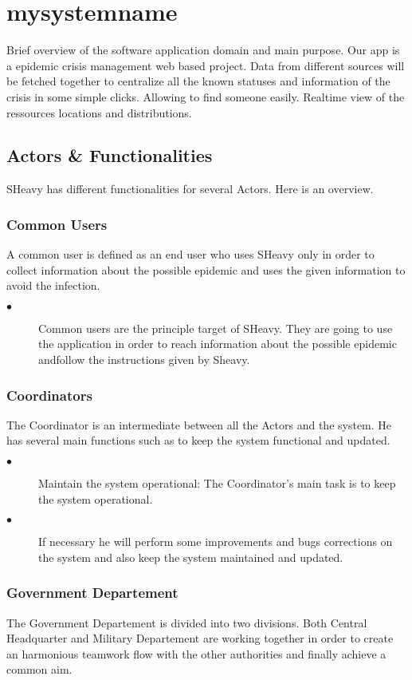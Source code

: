 \section{mysystemname}
Brief overview of the software application domain and main purpose.
Our app is a epidemic crisis management web based project. Data from different
sources will be fetched together to centralize all the known statuses and
information of the crisis in some simple clicks. Allowing to find someone
easily. Realtime view of the ressources locations and distributions.

\subsection{Actors \& Functionalities}
SHeavy has different functionalities for several Actors. Here is an overview.\\

\subsubsection{Common Users}
A common user is defined as an end user who uses SHeavy only in order to
collect information about the possible epidemic and uses the given information
to avoid the infection.
\begin{description}
 \item[$\bullet$] Common users are the principle target of SHeavy. They are
 going to use the application in order to reach information about the possible
 epidemic andfollow the instructions given by Sheavy.
\end{description}

\subsubsection{Coordinators}
The Coordinator is an intermediate between all the Actors and the system. He has
several main functions such as to keep the system functional and updated.
\begin{description}
 \item[$\bullet$] Maintain the system operational: The Coordinator's main task
 is to keep the system operational.
 \item[$\bullet$] If necessary he will perform some improvements and bugs
 corrections on the system and also keep the system maintained and updated.
\end{description} 

\subsubsection{Government Departement}
The Government Departement is divided into two divisions. Both Central
Headquarter and Military Departement are working together in order to create an harmonious teamwork 
flow with the other authorities and finally achieve a common aim.\\

